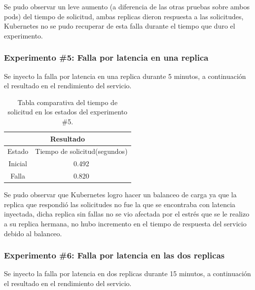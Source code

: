 \par Se pudo observar un leve aumento (a diferencia de las otras pruebas sobre ambos pods) del tiempo de solicitud, ambas replicas dieron respuesta a las solicitudes, Kubernetes no se pudo recuperar de esta falla durante el tiempo que duro el experimento.\\

\subsubsection{Experimento \#5: Falla por latencia en una replica}

\par Se inyecto la falla por latencia en una replica durante 5 minutos, a continuación el resultado en el rendimiento del servicio.\\

\begin{table}[ht!]
\begin{center}
\begin{tabular}{ |c|c| } 
 \hline
 \multicolumn{2}{|c|}{Resultado} \\
 \hline
 \hline
 Estado & Tiempo de solicitud(segundos)\\
 \hline
 Inicial & 0.492\\
 Falla & 0.820\\
 \hline
\end{tabular}
\end{center}
\caption{Tabla comparativa del tiempo de solicitud en los estados del experimento \#5.}
\label{tab:tabla49}
\end{table}

\par Se pudo observar que Kubernetes logro hacer un balanceo de carga ya que la replica que respondió las solicitudes no fue la que se encontraba con latencia inyectada, dicha replica sin fallas no se vio afectada por el estrés que se le realizo a su replica hermana, no hubo incremento en el tiempo de respuesta del servicio debido al balanceo.\\

\subsubsection{Experimento \#6: Falla por latencia en las dos replicas}

\par Se inyecto la falla por latencia en dos replicas durante 15 minutos, a continuación el resultado en el rendimiento del servicio.\\

